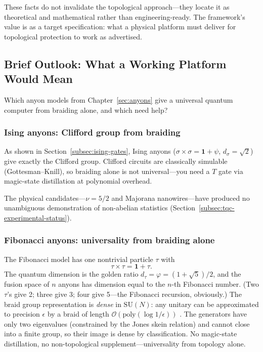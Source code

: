 \noindent These facts do not invalidate the topological approach---they locate it as theoretical and mathematical rather than engineering-ready.  The framework's value is as a target specification: what a physical platform must deliver for topological protection to work as advertised.

\subsection{Brief Outlook: What a Working Platform Would Mean}
\label{subsec:tqc-outlook}

Which anyon models from Chapter~\ref{sec:anyons} give a universal quantum computer from braiding alone, and which need help?

\subsubsection*{Ising anyons: Clifford group from braiding}

As shown in Section~\ref{subsec:ising-gates}, Ising anyons ($\sigma\times\sigma = \mathbf{1}+\psi$, $d_\sigma=\sqrt{2}$) give exactly the Clifford group.  Clifford circuits are classically simulable (Gottesman--Knill), so braiding alone is not universal---you need a $T$ gate via magic-state distillation at polynomial overhead.

The physical candidates---$\nu = 5/2$ and Majorana nanowires---have produced no unambiguous demonstration of non-abelian statistics (Section~\ref{subsec:tqc-experimental-status}).

\subsubsection*{Fibonacci anyons: universality from braiding alone}

The Fibonacci model has one nontrivial particle $\tau$ with
\begin{equation}
  \tau \times \tau = \mathbf{1} + \tau.
  \label{eq:fibonacci-fusion}
\end{equation}
The quantum dimension is the golden ratio $d_\tau = \varphi = (1+\sqrt{5})/2$, and the fusion space of $n$ anyons has dimension equal to the $n$-th Fibonacci number.  (Two $\tau$'s give 2; three give 3; four give 5---the Fibonacci recursion, obviously.)  The braid group representation is \emph{dense} in $\mathrm{SU}(N)$: any unitary can be approximated to precision $\epsilon$ by a braid of length $\mathcal{O}(\mathrm{poly}(\log 1/\epsilon))$ \cite{NayakSimonSternFreedmanDasSarma2008NonabelianAnyons}.  The generators have only two eigenvalues (constrained by the Jones skein relation) and cannot close into a finite group, so their image is dense by classification.  No magic-state distillation, no non-topological supplement---universality from topology alone.

